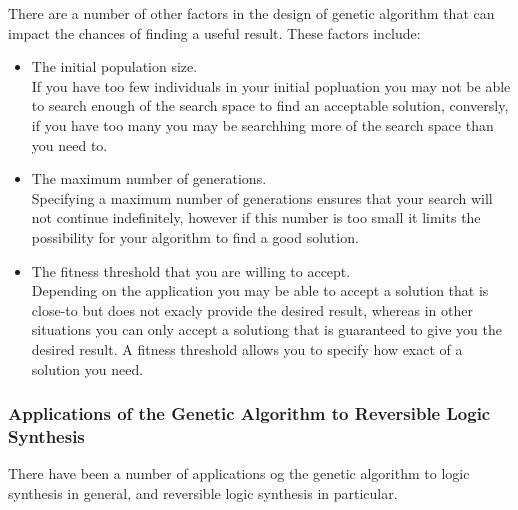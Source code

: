 There are a number of other factors in the design of genetic algorithm that can impact the chances of finding a useful result. 
These factors include:
\begin{itemize}
 \item The initial population size.
\\ If you have too few individuals in your initial popluation you may not be able to search enough of the search space to 
find an acceptable solution, conversly, if you have too many you may be searchhing more of the search space than you need to.
 \item The maximum number of generations.
\\ Specifying a maximum number of generations ensures that your search will not continue indefinitely, however if this number is too 
small it limits the possibility for your algorithm to find a good solution.
 \item The fitness threshold that you are willing to accept.
\\ Depending on the application you may be able to accept a solution that is close-to but does not exacly provide the desired result, 
whereas in other situations you can only accept a solutiong that is guaranteed to give you the desired result. A fitness threshold 
allows you to specify how exact of a solution you need. 
\end{itemize}
 

\subsubsection{Applications of the Genetic Algorithm to Reversible Logic Synthesis}

There have been a number of applications og the genetic algorithm to logic synthesis in general, and reversible logic synthesis in 
particular. \cite{Lukac2003} \cite{Lukac2008} \cite{Khan2004} \cite{Aguirre2003}